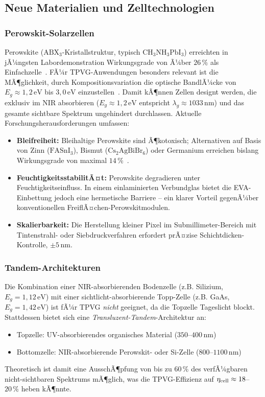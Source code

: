 ﻿\documentclass[a4paper,12pt]{article}
\theoremstyle{definition}
\theoremstyle{remark}
\begin{document}
\subsection{Neue Materialien und Zelltechnologien}

\subsubsection{Perowskit-Solarzellen}
Perowskite ($\mathrm{ABX_3}$-Kristallstruktur, typisch
$\mathrm{CH_3NH_3PbI_3}$) erreichten in jÃ¼ngsten Labordemonstration
Wirkungsgrade von Ã¼ber $26\,\%$ als Einfachzelle~\cite{NREL2024}. FÃ¼r
TPVG-Anwen\-dungen besonders relevant ist die MÃ¶glichkeit, durch
Kompositionsvariation die optische BandlÃ¼cke von $E_g \approx 1{,}2\,\mathrm{eV}$
bis $3{,}0\,\mathrm{eV}$ einzustellen~\cite{Noh2013}. Damit kÃ¶nnen Zellen
designt werden, die exklusiv im NIR absorbieren ($E_g \approx 1{,}2\,\mathrm{eV}$
entspricht $\lambda_g \approx 1033\,\mathrm{nm}$) und das gesamte sichtbare
Spektrum ungehindert durchlassen. Aktuelle Forschungsherausforderungen umfassen:
\begin{itemize}
  \item \textbf{Bleifreiheit:} Bleihaltige Perowskite sind Ã¶kotoxisch;
    Alternativen auf Basis von Zinn ($\mathrm{FASnI_3}$), Bismut
    ($\mathrm{Cs_2AgBiBr_6}$) oder Germanium erreichen bislang
    Wirkungsgrade von maximal $14\,\%$~\cite{Krishnamoorthy2015}.
  \item \textbf{FeuchtigkeitsstabilitÃ¤t:} Perowskite degradieren unter
    Feuchtigkeitseinfluss. In einem einlaminierten Verbundglas bietet die
    EVA-Einbettung jedoch eine hermetische Barriere -- ein klarer Vorteil
    gegenÃ¼ber konventionellen FreiflÃ¤chen-Perowskitmodu\-len.
  \item \textbf{Skalierbarkeit:} Die Herstellung kleiner Pixel im
    Submillimeter-Bereich mit Tinten\-strahl- oder Siebdruckverfahren
    erfordert prÃ¤zise Schichtdicken-Kon\-trol\-le, $\pm 5\,\mathrm{nm}$.
\end{itemize}

\subsubsection{Tandem-Architekturen}
Die Kombination einer NIR-absorbierenden Bodenzelle (z.B. Silizium,
$E_g = 1{,}12\,\mathrm{eV}$) mit einer sichtlicht-absorbierende Topp-Zelle
(z.B. GaAs, $E_g = 1{,}42\,\mathrm{eV}$) ist fÃ¼r TPVG \emph{nicht}
geeignet, da die Topzelle Tageslicht blockt. Stattdessen bietet sich eine
\emph{Transluzent-Tandem}-Architektur an:
\begin{itemize}
  \item Topzelle: UV-absorbierendes organisches Material
    ($350$--$400\,\mathrm{nm}$)
  \item Bottomzelle: NIR-absorbierende Perowskit- oder Si-Zelle
    ($800$--$1100\,\mathrm{nm}$)
\end{itemize}
Theoretisch ist damit eine AusschÃ¶pfung von bis zu $60\,\%$ des
verfÃ¼gbaren nicht-sichtbaren Spektrums mÃ¶glich, was die TPVG-Effizienz
auf $\eta_{\rm cell} \approx 18$--$20\,\%$ heben kÃ¶nnte.
\end{document}
